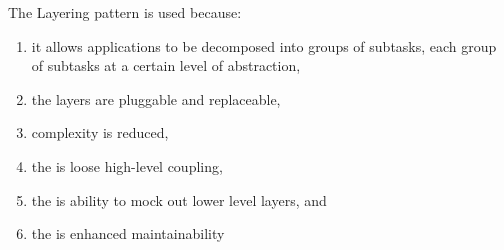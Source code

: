 The Layering pattern is used because:
\begin{enumerate}	
	\item it allows applications to be decomposed into groups of subtasks, each group of subtasks at a certain level of abstraction,
	\item the layers are pluggable and replaceable,
	\item complexity is reduced,
	\item the is loose high-level coupling,
	\item the is ability to mock out lower level layers, and
	\item the is enhanced maintainability
\end{enumerate}
